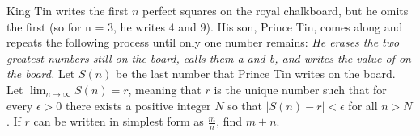 King Tin writes the first $n$ perfect squares on the royal chalkboard, but he omits the first (so for n = $3$, he writes $4$ and $9$). His son, Prince Tin, comes along and repeats the following process until only one number remains:
\textit{He erases the two greatest numbers still on the board, calls them a and b, and writes the value of  on the board.
}Let $S(n)$ be the last number that Prince Tin writes on the board. Let $\lim_{n\to \infty} S(n) = r$, meaning that $r$ is the unique number such that for every $\epsilon > 0$ there exists a positive integer $N$ so that $|S(n) - r| < \epsilon$ for all $n > N$. If $r$ can be written in simplest form as $\frac{m}{n}$, find $m + n$.